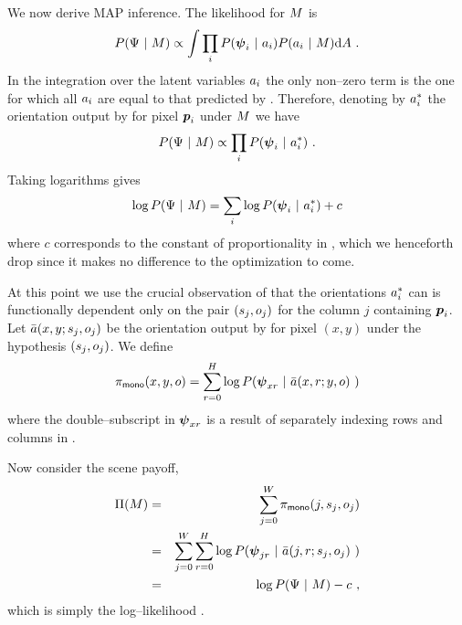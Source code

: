 We now derive MAP inference. The likelihood for $\Scene$ is
\begin{equation}
  \label{eq:mono-lik-full}
  P(\Features ~|~ \Scene) \propto 
  \int
    \prod_i P(\Feature_i ~|~ \Orient_i) 
            P(\Orient_i ~|~ \Scene)
  \intd \Orients ~.
\end{equation}
In the integration over the latent variables $\Orient_i$ the only
non--zero term is the one for which all $\Orient_i$ are equal to that
predicted by . Therefore, denoting by
$\PredictedOrient_i$ the orientation output by
 for pixel $\Pixel_i$ under $\Scene$ we
have
\begin{equation}
  \label{eq:mono-lik}
  P(\Features ~|~ \Scene) \propto
    \prod_i P(\Feature_i ~|~ \PredictedOrient_i) ~.
\end{equation}
Taking logarithms gives
\begin{equation}
  \label{eq:mono-loglik}
  \log P(\Features ~|~ \Scene) =
    \sum_i \log P(\Feature_i ~|~ \Orient_i^*) + c
\end{equation}
where $c$ corresponds to the constant of proportionality in
, which we henceforth drop since it makes no
difference to the optimization to come. 

At this point we use the crucial observation of
 that the orientations
$\PredictedOrient_i$ can is functionally dependent only on the pair
$(\seam_j,\WallOrient_j)$ for the column $j$ containing
$\Pixel_i$. Let $\ComputedOrient(x,y;\seam_j,\WallOrient_j)$ be the
orientation output by  for pixel $(x,y)$
under the hypothesis $(\seam_j,\WallOrient_j)$. We define
\begin{equation}
  \label{eq:mono-payoffs}
  \MonoPayoff(x,y,\WallOrient) = \sum_{r=0}^H \log 
    P(\Feature_{xr} ~|~ \ComputedOrient(x,r;y,\WallOrient)~)
\end{equation}
where the double--subscript in $\Feature_{xr}$ is a result of
separately indexing rows and columns in \label{eq:mono-payoffs}. 

Now consider the scene payoff,
\begin{eqnarray}
  \ScenePayoff(\Scene) &=& 
    \sum_{j=0}^W \MonoPayoff(j, \seam_j, \WallOrient_j) \\
  &=& 
    \sum_{j=0}^W \sum_{r=0}^H \log
      P(\Feature_{jr} ~|~ \ComputedOrient(j,r;\seam_j,\WallOrient_j)~)\\
  &=&
    \log P(\Features ~|~ \Scene) - c  ~,
\end{eqnarray}
which is simply the log--likelihood .

